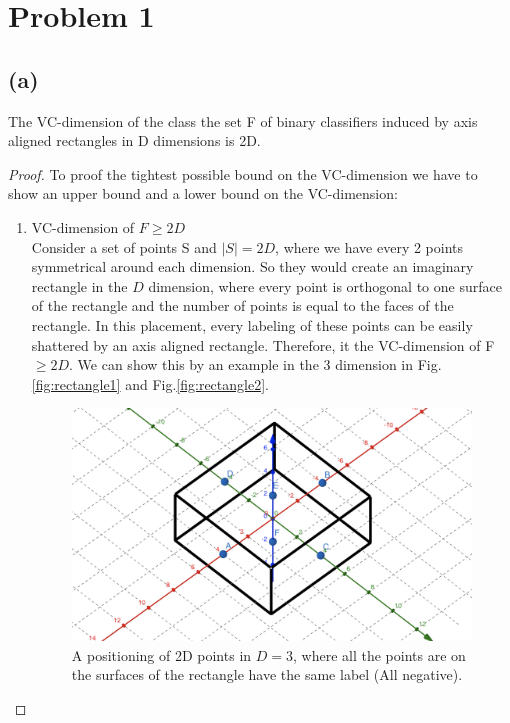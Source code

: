 \documentclass[]{homework}
\begin{document}
\maketitle

\section*{Problem 1}
\subsection*{(a)}
The VC-dimension of the class the set F of binary classifiers induced by axis aligned rectangles in D dimensions is 2D. 
\begin{proof}
To proof the tightest possible bound on the VC-dimension we have to show an upper bound and a lower bound on the VC-dimension: 
\begin{enumerate}
    \item VC-dimension of $F \geq 2D$ \\ %
    Consider a set of points S and $|S| = 2D$, where we have every 2 points symmetrical around each dimension. So they would create an imaginary rectangle in the $D$ dimension, where every point is orthogonal to one surface of the rectangle and the number of points is equal to the faces of the rectangle. In this placement, every labeling of these points can be easily shattered by an axis aligned rectangle. Therefore, it the   VC-dimension of F $\geq 2D$.
    We can show this by an example in the 3 dimension in Fig.\ref{fig:rectangle1} and Fig.\ref{fig:rectangle2}. \\
    \begin{figure}[!h]
        \centering
        \includegraphics[width=4.5in]{figs/rectangle1.png}
        \caption{A positioning of 2D points in $D=3$, where all the points are on the surfaces of the rectangle have the same label (All negative).}

\end{figure}
\end{enumerate}
\end{proof}
\end{document}
